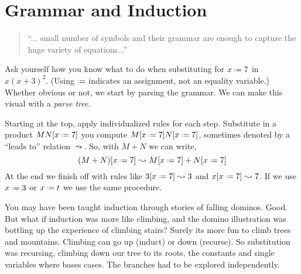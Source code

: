 \chapter{Grammar and Induction}

\begin{quote}
``... small number
of symbols and their grammar are enough to capture the huge
variety of equations...''
\end{quote}

Ask yourself how you know what to do when  
substituting for $x\defeq 7$ in $x(x+3)^{2}$.
(Using $\defeq$ indicates an assignment, not an equality variable.)
Whether obvious or not, we start by parsing the grammar.  We can make this 
visual with a \emph{parse tree}.
\begin{center}
\end{center}
Starting at the top, apply individualized 
rules for each step.  Substitute in a product $MN[x\defeq 7]$ you compute 
$M[x\defeq 7]N[x\defeq 7]$,
sometimes denoted by a ``leads to'' relation $\leadsto$. So,
with $M+N$ we can write,
\[
    (M+N)[x\defeq 7]\leadsto M[x\defeq 7]+N[x\defeq 7]
\]
At the end we finish off with rules like $3[x\defeq 7]\leadsto 3$ and $x[x\defeq 7]\leadsto 7$.
If we use $x\defeq 3$ or $x\defeq t$ we use the same procedure.

You may have been taught induction through stories of falling 
dominos.  Good.  But what if induction was more like climbing, 
and the domino illustration was bottling up the experience
of climbing stairs?  Surely its more fun to climb trees and mountains.
Climbing can go up (induct) or down (recurse).
So substitution was recursing, climbing down our tree to its roots, the constants 
and single variables where bases cases.  The branches had to be explored independently.


